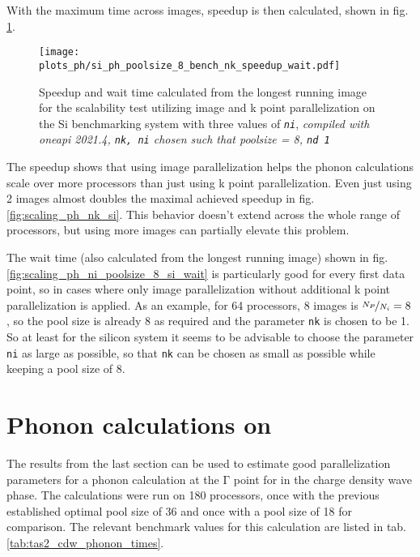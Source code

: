 \documentclass[main.tex]{subfiles}
\begin{document}
With the maximum time across images, speedup is then calculated, shown in fig. \ref{fig:scaling_ph_ni_poolsize_8_si}.

\begin{figure}[htb!]
    \centering
    \texttt{[image: plots\_ph/si\_ph\_poolsize\_8\_bench\_nk\_speedup\_wait.pdf]}
    \caption{Speedup and wait time calculated from the longest running image for the scalability test utilizing image and k point parallelization on the Si benchmarking system with three values of \emph{\texttt{ni}}, \emph{\QE compiled with \gls{oneapi} 2021.4, \texttt{nk, ni} chosen such that poolsize = 8, \texttt{nd 1}}}
    \label{fig:scaling_ph_ni_poolsize_8_si}
\end{figure}
The speedup shows that using image parallelization helps the phonon calculations scale over more processors than just using k point parallelization.
Even just using 2 images almost doubles the maximal achieved speedup in fig. \ref{fig:scaling_ph_nk_si}.
This behavior doesn't extend across the whole range of processors, but using more images can partially elevate this problem.

The wait time (also calculated from the longest running image) shown in fig. \ref{fig:scaling_ph_ni_poolsize_8_si_wait} is particularly good for every first data point, so in cases where only image parallelization without additional k point parallelization is applied.
As an example, for 64 processors, 8 images is \(\nicefrac{N_P}{N_i} = 8\), so the pool size is already 8 as required and the parameter \texttt{nk} is chosen to be 1.
So at least for the silicon system it seems to be advisable to choose the parameter \texttt{ni} as large as possible, so that \texttt{nk} can be chosen as small as possible while keeping a pool size of 8.

\section{Phonon calculations on \TaS}

The results from the last section can be used to estimate good parallelization parameters for a phonon calculation at the \(\mathrm{\Gamma}\) point for \TaS in the charge density wave phase.
The calculations were run on 180 processors, once with the previous established optimal pool size of 36 and once with a pool size of 18 for comparison.
The relevant benchmark values for this calculation are listed in tab. \ref{tab:tas2_cdw_phonon_times}.
\end{document}
